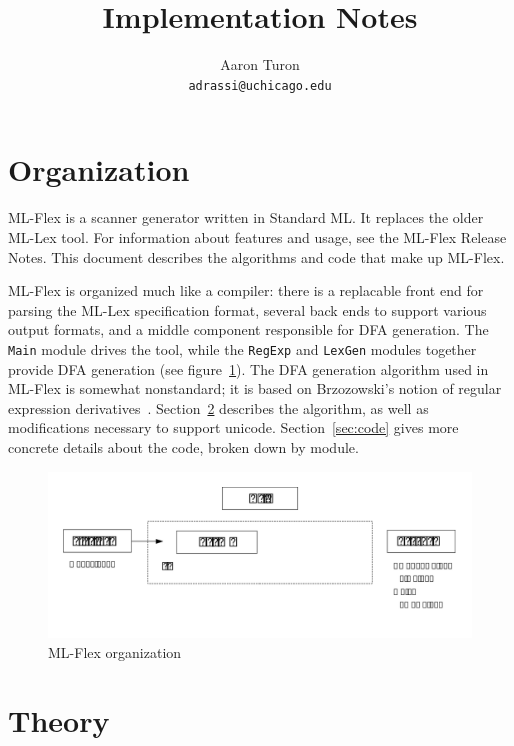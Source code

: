 \documentclass[11pt]{article}
\title{\flex{} Implementation Notes}
\author{Aaron Turon\\
\texttt{adrassi@uchicago.edu}}
\newcommand{\flex}{ML-Flex}
\newcommand{\nm}[1]{\texttt{#1}}
\begin{document}
\maketitle
\tableofcontents

\newpage
\section{Organization}

\flex{} is a scanner generator written in Standard ML.  It replaces the older
ML-Lex tool.  For information about features and usage, see the \flex{} 
Release Notes.  This document describes the algorithms and code that make up
\flex{}.

\flex{} is organized much like a compiler: there is a replacable front end for
parsing the ML-Lex specification format, several back ends to support various
output formats, and a middle component responsible for DFA generation.  The
\nm{Main} module drives the tool, while the \nm{RegExp} and \nm{LexGen} modules
together provide DFA generation (see figure~\ref{fig:ml-flex}).  The DFA
generation algorithm used in \flex{} is somewhat nonstandard; it is based on
Brzozowski's notion of regular expression derivatives~\cite{derivatives}. 
Section~\ref{sec:theory} describes the algorithm, as well as modifications
necessary to support unicode.  Section~\ref{sec:code} gives more concrete
details about the code, broken down by module.

\begin{figure}\label{fig:ml-flex}
\begin{center}
\ifpdf
  \includegraphics[scale=0.8]{impl-pic.pdf}
\fi
\end{center}
\caption{\flex{} organization}
\end{figure}

\newpage
\section{Theory}\label{sec:theory}
\end{document}
